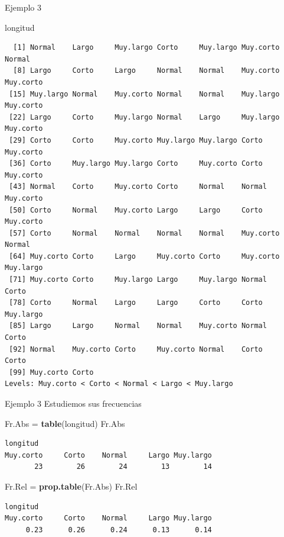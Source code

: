 \documentclass[
  ignorenonframetext,
]{beamer}
\newenvironment{Shaded}{\begin{snugshade}}{\end{snugshade}}
\newcommand{\FunctionTok}[1]{\textcolor[rgb]{0.13,0.29,0.53}{\textbf{#1}}}
\newcommand{\NormalTok}[1]{#1}
\newcommand{\OtherTok}[1]{\textcolor[rgb]{0.56,0.35,0.01}{#1}}
\begin{document}
\begin{frame}[fragile]{Ejemplo 3}
\label{ejemplo-3-1}
\begin{Shaded}
\begin{Highlighting}[]
\NormalTok{longitud}
\end{Highlighting}
\end{Shaded}

\begin{verbatim}
  [1] Normal    Largo     Muy.largo Corto     Muy.largo Muy.corto Normal   
  [8] Largo     Corto     Largo     Normal    Normal    Muy.corto Muy.corto
 [15] Muy.largo Normal    Muy.corto Normal    Normal    Muy.largo Muy.corto
 [22] Largo     Corto     Muy.largo Normal    Largo     Muy.largo Muy.corto
 [29] Corto     Corto     Muy.corto Muy.largo Muy.largo Corto     Muy.corto
 [36] Corto     Muy.largo Muy.largo Corto     Muy.corto Corto     Muy.corto
 [43] Normal    Corto     Muy.corto Corto     Normal    Normal    Muy.corto
 [50] Corto     Normal    Muy.corto Largo     Largo     Corto     Muy.corto
 [57] Corto     Normal    Normal    Normal    Normal    Muy.corto Normal   
 [64] Muy.corto Corto     Largo     Muy.corto Corto     Muy.corto Muy.largo
 [71] Muy.corto Corto     Muy.largo Largo     Muy.largo Normal    Corto    
 [78] Corto     Normal    Largo     Largo     Corto     Corto     Muy.largo
 [85] Largo     Largo     Normal    Normal    Muy.corto Normal    Corto    
 [92] Normal    Muy.corto Corto     Muy.corto Normal    Corto     Corto    
 [99] Muy.corto Corto    
Levels: Muy.corto < Corto < Normal < Largo < Muy.largo
\end{verbatim}
\end{frame}

\begin{frame}[fragile]{Ejemplo 3}
\label{ejemplo-3-2}
Estudiemos sus frecuencias

\begin{Shaded}
\begin{Highlighting}[]
\NormalTok{Fr.Abs }\OtherTok{=} \FunctionTok{table}\NormalTok{(longitud)}
\NormalTok{Fr.Abs}
\end{Highlighting}
\end{Shaded}

\begin{verbatim}
longitud
Muy.corto     Corto    Normal     Largo Muy.largo 
       23        26        24        13        14 
\end{verbatim}

\begin{Shaded}
\begin{Highlighting}[]
\NormalTok{Fr.Rel }\OtherTok{=} \FunctionTok{prop.table}\NormalTok{(Fr.Abs)}
\NormalTok{Fr.Rel}
\end{Highlighting}
\end{Shaded}

\begin{verbatim}
longitud
Muy.corto     Corto    Normal     Largo Muy.largo 
     0.23      0.26      0.24      0.13      0.14 
\end{verbatim}
\end{frame}
\end{document}
